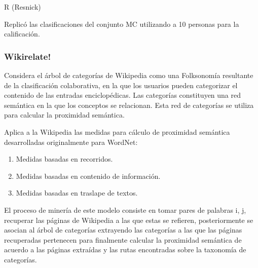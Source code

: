 \documentclass[letterpaper]{article}
\newcommand\liststyleWWviiiNumvi{%
\renewcommand\theenumi{\arabic{enumi}}
\renewcommand\theenumii{\arabic{enumii}}
\renewcommand\theenumiii{\arabic{enumiii}}
\renewcommand\theenumiv{\arabic{enumiv}}
\renewcommand\labelenumi{\theenumi.}
\renewcommand\labelenumii{\theenumii.}
\renewcommand\labelenumiii{\theenumiii.}
\renewcommand\labelenumiv{\theenumiv.}
}
\begin{document}
\bigskip

{\sffamily
R (Resnick)}


\bigskip

{\sffamily
Replic\'o las clasificaciones del conjunto MC utilizando a 10 personas
para la calificaci\'on.}

%


\subsubsection[Wikirelate!]{Wikirelate!}
\hypertarget{RefHeading335057232820}{}
\bigskip

{\sffamily
Considera el \'arbol de categor\'ias de Wikipedia como una Folksonom\'ia
resultante de la clasificaci\'on colaborativa, en la que los usuarios
pueden categorizar el contenido de las entradas enciclop\'edicas. Las
categor\'ias constituyen una red sem\'antica en la que los conceptos se
relacionan. Esta red de categor\'ias se utiliza para calcular la
proximidad sem\'antica.}


\bigskip

{\sffamily
Aplica a la Wikipedia las medidas para c\'alculo de proximidad
sem\'antica desarrolladas originalmente para WordNet:}


\bigskip

\liststyleWWviiiNumvi
\begin{enumerate}
\item {\sffamily
Medidas basadas en recorridos.}
\item {\sffamily
Medidas basadas en contenido de informaci\'on.}
\item {\sffamily
Medidas basadas en traslape de textos.}
\end{enumerate}

\bigskip

{\sffamily
El proceso de miner\'ia de este modelo consiste en tomar pares de
palabras i, j, recuperar las p\'aginas de Wikipedia a las que estas se
refieren, posteriormente se asocian al \'arbol de categor\'ias
extrayendo las categor\'ias a las que las p\'aginas recuperadas
pertenecen para finalmente calcular la proximidad sem\'antica de
acuerdo a las p\'aginas extra\'idas y las rutas encontradas sobre la
taxonom\'ia de categor\'ias.}
\end{document}
